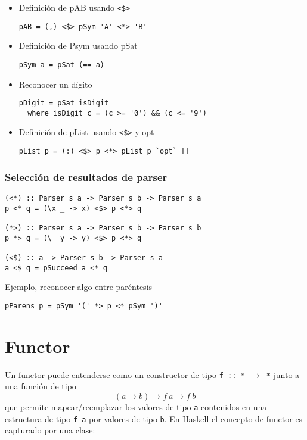 \documentclass{article}
\newcommand{\imp}[1]{\textcolor{color1}{#1}}
\begin{document}
\begin{itemize}
\item Definición de \imp{pAB} usando \texttt{<\$>}

\begin{lstlisting}
pAB = (,) <$> pSym 'A' <*> 'B'
\end{lstlisting}
\item Definición de \imp{Psym} usando \imp{pSat}

\begin{lstlisting}
pSym a = pSat (== a)
\end{lstlisting}
\item Reconocer un dígito

\begin{lstlisting}
pDigit = pSat isDigit
  where isDigit c = (c >= '0') && (c <= '9')
\end{lstlisting}
\item Definición de \imp{pList} usando \texttt{<\$>} y \imp{opt}

\begin{lstlisting}
pList p = (:) <$> p <*> pList p `opt` []
\end{lstlisting}
\end{itemize}

\subsubsection{Selección de resultados de parser}

\begin{lstlisting}
(<*) :: Parser s a -> Parser s b -> Parser s a
p <* q = (\x _ -> x) <$> p <*> q

(*>) :: Parser s a -> Parser s b -> Parser s b
p *> q = (\_ y -> y) <$> p <*> q

(<$) :: a -> Parser s b -> Parser s a
a <$ q = pSucceed a <* q
\end{lstlisting}

Ejemplo, reconocer algo entre paréntesis
\begin{lstlisting}
pParens p = pSym '(' *> p <* pSym ')'
\end{lstlisting}
\section{Functor}\label{sec:functor}

\noindent Un \imp{functor} puede entenderse como un constructor de tipo \texttt{f :: * $\rightarrow$ *} junto a una función de tipo 
\[(a  \rightarrow b) \rightarrow f~a \rightarrow f~b\]
que permite mapear/reemplazar los valores de tipo \imp{\texttt{a}} contenidos en una estructura de tipo \imp{\texttt{f a}} por valores de tipo \imp{\texttt{b}}. En Haskell el concepto de functor es capturado por una clase:
\end{document}
